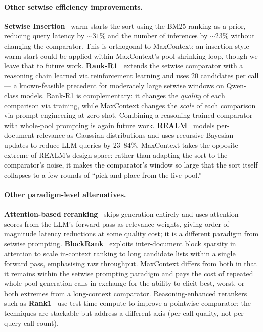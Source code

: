 \paragraph{Other setwise efficiency improvements.}
\textbf{Setwise Insertion}~\citep{podolak2025setwiseinsertion} warm-starts the
sort using the BM25 ranking as a prior, reducing query latency by
$\sim31\%$ and the number of inferences by $\sim23\%$ without changing the
comparator. This is orthogonal to MaxContext: an insertion-style warm start
could be applied within MaxContext's pool-shrinking loop, though we leave
that to future work. \textbf{Rank-R1}~\citep{zhuang2025rankr1} extends the
setwise comparator with a reasoning chain learned via reinforcement learning
and uses $20$ candidates per call --- a known-feasible precedent for
moderately large setwise windows on Qwen-class models. Rank-R1 is
complementary: it changes the \emph{quality} of each comparison via training,
while MaxContext changes the \emph{scale} of each comparison via
prompt-engineering at zero-shot. Combining a reasoning-trained comparator
with whole-pool prompting is again future work.
\textbf{REALM}~\citep{wang2025realm} models per-document relevance as
Gaussian distributions and uses recursive Bayesian updates to reduce LLM
queries by 23--84\%. MaxContext takes the opposite extreme of REALM's design
space: rather than adapting the sort to the comparator's noise, it makes the
comparator's window so large that the sort itself collapses to a few rounds
of ``pick-and-place from the live pool.''

\paragraph{Other paradigm-level alternatives.}
\textbf{Attention-based reranking}~\citep{chen2025icr} skips generation
entirely and uses attention scores from the LLM's forward pass as relevance
weights, giving order-of-magnitude latency reductions at some quality cost;
it is a different paradigm from setwise prompting.
\textbf{BlockRank}~\citep{gupta2025blockrank} exploits inter-document block
sparsity in attention to scale in-context ranking to long candidate lists
within a single forward pass, emphasising raw throughput.
MaxContext differs from both in that it remains within the setwise prompting
paradigm and pays the cost of repeated whole-pool generation calls in
exchange for the ability to elicit best, worst, or both extremes from a
long-context comparator. Reasoning-enhanced rerankers such as
\textbf{Rank1}~\citep{rank1_2025} use test-time compute to improve a
pointwise comparator; the techniques are stackable but address a different
axis (per-call quality, not per-query call count).

